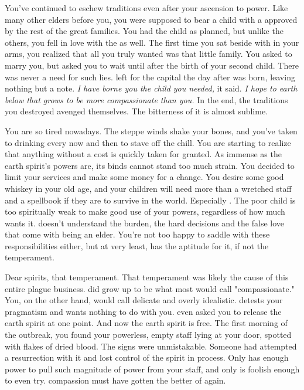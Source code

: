 \documentclass[char]{guildcamp4}
\begin{document}
You've continued to eschew traditions even after your ascension to power. Like many other elders before you, you were supposed to bear a child with a \cElderSpouse{\human} approved by the rest of the great families. You had the child as planned, but unlike the others, you fell in love with the \cElderSpouse{\human} as well. The first time you sat beside \cElderSpouse{\intro} with \cApprentice{} in your arms, you realized that all you truly wanted was that little family. You asked \cElderSpouse{\them} to marry you, but \cElderSpouse{\they} asked you to wait until after the birth of your second child. There was never a need for such lies. \cElderSpouse{} left for the capital the day after \cRebel{} was born, leaving nothing but a note. \textit{I have borne you the child you needed,} it said. \textit{I hope to earth below that \cRebel{\they} grows to be more compassionate than you.} In the end, the traditions you destroyed avenged themselves. The bitterness of it is almost sublime.

You are so tired nowadays. The steppe winds shake your bones, and you've taken to drinking every now and then to stave off the chill. You are starting to realize that anything without a cost is quickly taken for granted. As immense as the earth spirit's powers are, its binds cannot stand too much strain. You decided to limit your services and make some money for a change. You desire some good whiskey in your old age, and your children will need more than a wretched staff and a spellbook if they are to survive in the world. Especially \cApprentice{}. The poor child is too spiritually weak to make good use of your powers, regardless of how much \cApprentice{\they} wants it. \cApprentice{\They} doesn't understand the burden, the hard decisions and the false love that come with being an elder. You're not too happy to saddle \cRebel{} with these responsibilities either, but at very least, \cRebel{\they} has the aptitude for it, if not the temperament.

Dear spirits, that temperament. That temperament was likely the cause of this entire plague business. \cRebel{} did grow up to be what most would call "compassionate." You, on the other hand, would call \cRebel{\them} delicate and overly idealistic. \cRebel{} detests your pragmatism and wants nothing to do with you. \cRebel{\They} even asked you to release the earth spirit at one point. And now the earth spirit is free. The first morning of the outbreak, you found your powerless, empty staff lying at your door, spotted with flakes of dried blood. The signs were unmistakable. Someone had attempted a resurrection with it and lost control of the spirit in process. Only \cRebel{} has enough power to pull such magnitude of power from your staff, and only \cRebel{\they} is foolish enough to even try. \cRebel{\Their} compassion must have gotten the better of \cRebel{\them} again. 
\end{document}

